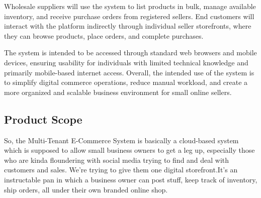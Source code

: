Wholesale suppliers will use the system to list products in bulk, manage available inventory, and receive purchase orders from registered sellers. End customers will interact with the platform indirectly through individual seller storefronts, where they can browse products, place orders, and complete purchases.

The system is intended to be accessed through standard web browsers and mobile devices, ensuring usability for individuals with limited technical knowledge and primarily mobile-based internet access. Overall, the intended use of the system is to simplify digital commerce operations, reduce manual workload, and create a more organized and scalable business environment for small online sellers.

\subsection{Product Scope}  
So, the Multi-Tenant E-Commerce System is basically a cloud-based system which is supposed to allow small business owners to get a leg up, especially those who are kinda floundering with social media trying to find and deal with customers and sales. We're trying to give them one digital storefront.It's an instructable pan in which a business owner can post stuff, keep track of inventory, ship orders, all under their own branded online shop.

